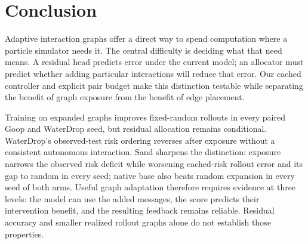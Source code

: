\section{Conclusion}
Adaptive interaction graphs offer a direct way to spend computation where a particle simulator needs it. The central difficulty is deciding what that need means. A residual head predicts error under the current model; an allocator must predict whether adding particular interactions will reduce that error. Our cached controller and explicit pair budget make this distinction testable while separating the benefit of graph exposure from the benefit of edge placement.

Training on expanded graphs improves fixed-random rollouts in every paired Goop and WaterDrop seed, but residual allocation remains conditional. WaterDrop's observed-test risk ordering reverses after exposure without a consistent autonomous interaction. Sand sharpens the distinction: exposure narrows the observed risk deficit while worsening cached-risk rollout error and its gap to random in every seed; native base also beats random expansion in every seed of both arms. Useful graph adaptation therefore requires evidence at three levels: the model can use the added messages, the score predicts their intervention benefit, and the resulting feedback remains reliable. Residual accuracy and smaller realized rollout graphs alone do not establish those properties.
